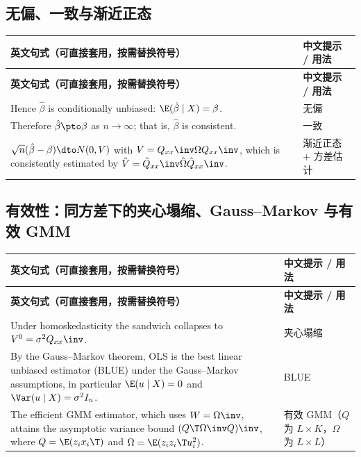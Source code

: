 \subsection{无偏、一致与渐近正态}

{\renewcommand{\arraystretch}{1.15}\begin{longtable}{@{}>{\raggedright\arraybackslash}p{11.4cm}>{\raggedright\arraybackslash\small}p{4.3cm}@{}}
\toprule
\textbf{英文句式（可直接套用，按需替换符号）} & \textbf{中文提示 / 用法}\\
\midrule
\endfirsthead
\toprule
\textbf{英文句式（可直接套用，按需替换符号）} & \textbf{中文提示 / 用法}\\
\midrule
\endhead
\bottomrule
\endlastfoot
Hence $\hat\beta$ is conditionally unbiased: $\E(\hat\beta\mid X)=\beta$. & 无偏\\
\addlinespace[2pt]
Therefore $\hat\beta\pto\beta$ as $n\to\infty$; that is, $\hat\beta$ is consistent. & 一致\\
\addlinespace[2pt]
$\sqrt n(\hat\beta-\beta)\dto N(0,V)$ with $V=Q_{xx}\inv\Omega Q_{xx}\inv$, which is consistently estimated by $\hat V=\hat Q_{xx}\inv\hat\Omega\hat Q_{xx}\inv$. & 渐近正态 + 方差估计\\
\end{longtable}}


\subsection{有效性：同方差下的夹心塌缩、Gauss–Markov 与有效 GMM}

{\renewcommand{\arraystretch}{1.15}\begin{longtable}{@{}>{\raggedright\arraybackslash}p{11.4cm}>{\raggedright\arraybackslash\small}p{4.3cm}@{}}
\toprule
\textbf{英文句式（可直接套用，按需替换符号）} & \textbf{中文提示 / 用法}\\
\midrule
\endfirsthead
\toprule
\textbf{英文句式（可直接套用，按需替换符号）} & \textbf{中文提示 / 用法}\\
\midrule
\endhead
\bottomrule
\endlastfoot
Under homoskedasticity the sandwich collapses to $V^0=\sigma^2Q_{xx}\inv$. & 夹心塌缩\\
\addlinespace[2pt]
By the Gauss--Markov theorem, OLS is the best linear unbiased estimator (BLUE) under the Gauss--Markov assumptions, in particular $\E(u\mid X)=0$ and $\Var(u\mid X)=\sigma^2I_n$. & BLUE\\
\addlinespace[2pt]
The efficient GMM estimator, which uses $W=\Omega\inv$, attains the asymptotic variance bound $(Q\T\Omega\inv Q)\inv$, where $Q=\E(z_ix_i\T)$ and $\Omega=\E(z_iz_i\T u_i^2)$. & 有效 GMM（$Q$ 为 $L\times K$，$\Omega$ 为 $L\times L$）\\
\end{longtable}}


